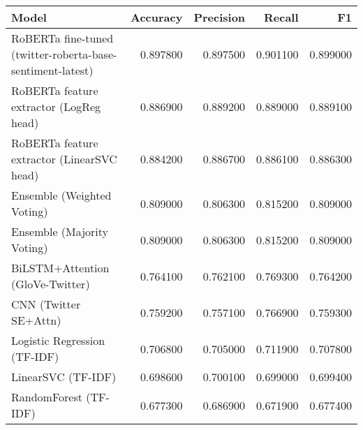 \begin{tabular}{lrrrr}
\toprule
Model & Accuracy & Precision & Recall & F1 \\
\midrule
RoBERTa fine-tuned (twitter-roberta-base-sentiment-latest) & 0.897800 & 0.897500 & 0.901100 & 0.899000 \\
RoBERTa feature extractor (LogReg head) & 0.886900 & 0.889200 & 0.889000 & 0.889100 \\
RoBERTa feature extractor (LinearSVC head) & 0.884200 & 0.886700 & 0.886100 & 0.886300 \\
Ensemble (Weighted Voting) & 0.809000 & 0.806300 & 0.815200 & 0.809000 \\
Ensemble (Majority Voting) & 0.809000 & 0.806300 & 0.815200 & 0.809000 \\
BiLSTM+Attention (GloVe-Twitter) & 0.764100 & 0.762100 & 0.769300 & 0.764200 \\
CNN (Twitter SE+Attn) & 0.759200 & 0.757100 & 0.766900 & 0.759300 \\
Logistic Regression (TF-IDF) & 0.706800 & 0.705000 & 0.711900 & 0.707800 \\
LinearSVC (TF-IDF) & 0.698600 & 0.700100 & 0.699000 & 0.699400 \\
RandomForest (TF-IDF) & 0.677300 & 0.686900 & 0.671900 & 0.677400 \\
\bottomrule
\end{tabular}
